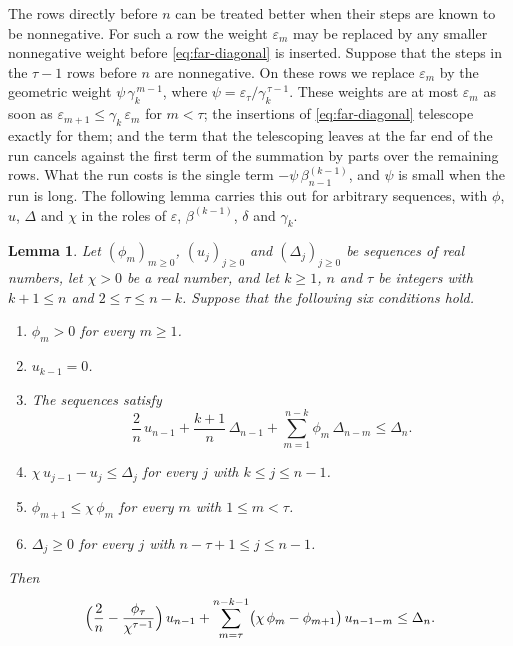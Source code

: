 \documentclass{amsart}
\newtheorem{lemma}[theorem]{Lemma}
\theoremstyle{definition}
\theoremstyle{remark}
\numberwithin{equation}{section}
\begin{document}
The rows directly before $n$ can be treated better when their steps are known
to be nonnegative. For such a row the weight $\varepsilon_m$ may be replaced
by any smaller nonnegative weight before \eqref{eq:far-diagonal} is inserted.
Suppose that the steps in the $\tau-1$ rows before $n$ are nonnegative. On
these rows we replace $\varepsilon_m$ by the geometric weight
$\psi\,\gamma_k^{\,m-1}$, where $\psi=\varepsilon_\tau/\gamma_k^{\,\tau-1}$.
These weights are at most $\varepsilon_m$ as soon as
$\varepsilon_{m+1}\le\gamma_k\,\varepsilon_m$ for $m<\tau$; the insertions of
\eqref{eq:far-diagonal} telescope exactly for them; and the term that the
telescoping leaves at the far end of the run cancels against the first term
of the summation by parts over the remaining rows. What the run costs is the
single term $-\psi\,\beta^{(k-1)}_{n-1}$, and $\psi$ is small when the run is
long. The following lemma carries this out for arbitrary sequences, with
$\phi$, $u$, $\Delta$ and $\chi$ in the roles of $\varepsilon$,
$\beta^{(k-1)}$, $\delta$ and $\gamma_k$.

\begin{lemma}\label{lem:runbound}
Let $(\phi_m)_{m\ge0}$, $(u_j)_{j\ge0}$ and $(\Delta_j)_{j\ge0}$ be sequences
of real numbers, let $\chi>0$ be a real number, and let $k\ge1$, $n$ and
$\tau$ be integers with $k+1\le n$ and $2\le\tau\le n-k$. Suppose that the
following six conditions hold.
\begin{enumerate}
\item $\phi_m>0$ for every $m\ge1$.
\item $u_{k-1}=0$.
\item The sequences satisfy
\[
\frac2n\,u_{n-1}+\frac{k+1}{n}\,\Delta_{n-1}
+\sum_{m=1}^{n-k}\phi_m\,\Delta_{n-m}\le\Delta_n .
\]
\item $\chi\,u_{j-1}-u_j\le\Delta_j$ for every $j$ with $k\le j\le n-1$.
\item $\phi_{m+1}\le\chi\,\phi_m$ for every $m$ with $1\le m<\tau$.
\item $\Delta_j\ge0$ for every $j$ with $n-\tau+1\le j\le n-1$.
\end{enumerate}
Then
\[
\Bigl(\frac2n-\frac{\phi_\tau}{\chi^{\tau-1}}\Bigr)\,u_{n-1}
+\sum_{m=\tau}^{n-k-1}\bigl(\chi\,\phi_m-\phi_{m+1}\bigr)\,u_{n-1-m}
\le\Delta_n .
\]
\end{lemma}
\end{document}
